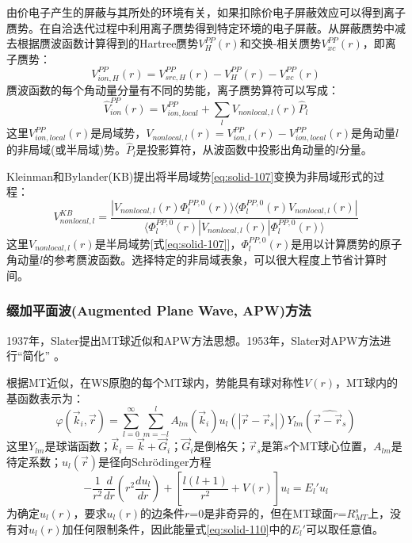 由价电子产生的屏蔽与其所处的环境有关，如果扣除价电子屏蔽效应可以得到离子赝势。在自洽迭代过程中利用离子赝势得到特定环境的电子屏蔽。从屏蔽赝势中减去根据赝波函数计算得到的Hartree赝势$V_H^{PP}(r)$和交换-相关赝势$V_{xc}^{PP}(r)$，即离子赝势\cite{PRB43-1993_1991}：
$$V_{ion,H}^{PP}(r)=V_{src,H}^{PP}(r)-V_H^{PP}(r)-V_{xc}^{PP}(r)$$
赝波函数的每个角动量分量有不同的势能，离子赝势算符可以写成：
\begin{equation}
  \hat V_{ion}^{PP}(r)=V_{ion,local}^{PP}+\sum_lV_{nonlocal,l}(r)\hat P_l
  \label{eq:solid-107}
\end{equation}
这里$V_{ion,local}^{PP}(r)$是局域势，$V_{nonlocal,l}(r)=V_{ion,l}^{PP}(r)-V_{ion,local}^{PP}(r)$是角动量$l$的非局域(或半局域)势。$\hat P_l$是投影算符，从波函数中投影出角动量的$l$分量。

Kleinman和Bylander(KB)\cite{PRL48-1425_1982}提出将半局域势\eqref{eq:solid-107}变换为非局域形式的过程：
$$V_{nonlocal,l}^{KB}=\dfrac{|V_{nonlocal,l}(r)\Phi_l^{PP,0}(r)\rangle\langle\Phi_l^{PP,0}(r)V_{nonlocal,l}(r)|}{\langle\Phi_l^{PP,0}(r)|V_{nonlocal,l}(r)|\Phi_l^{PP,0}(r)\rangle}$$
这里$V_{nonlocal,l}(r)$是半局域势[式\eqref{eq:solid-107}]，$\Phi_l^{PP,0}(r)$是用以计算赝势的原子角动量$l$的参考赝波函数。选择特定的非局域表象，可以很大程度上节省计算时间。

\subsubsection{缀加平面波(Augmented Plane Wave, APW)方法}
1937年，Slater提出MT球近似和APW方法思想\cite{PR51-846_1937}。1953年，Slater对APW方法进行“简化”\cite{PR91-528_1953}%
。

根据MT近似，在WS原胞的每个MT球内，势能具有球对称性$V(r)$，MT球内的基函数表示为：
\begin{equation}
  \varphi(\vec k_i,\vec r)=\sum_{l=0}^{\infty}\sum_{m=-l}^lA_{lm}(\vec k_i)u_l(|\vec r-\vec r_s|)Y_{lm}(\widehat{\vec r-\vec r_s})
  \label{eq:solid-109}
\end{equation}
这里$Y_{lm}$是球谐函数；$\vec k_i=\vec k+\vec G_i$；$\vec G_i$是倒格矢；$\vec r_s$是第$s$个MT球心位置，$A_{lm}$是待定系数；$u_l(\vec r)$是径向Schr\"odinger方程
\begin{equation}
  -\frac1{r^2}\frac d{dr}\left(r^2\frac{du_l}{dr}\right)+\left[\frac{l(l+1)}{r^2}+V(r)\right]u_l=E_l'u_l
  \label{eq:solid-110}
\end{equation}
为确定$u_l(r)$，要求$u_l(r)$的边条件$r$=0是非奇异的，但在MT球面$r$=$R_{MT}^s$上，没有对$u_l(r)$加任何限制条件，因此能量式\eqref{eq:solid-110}中的$E_l'$可以取任意值。

